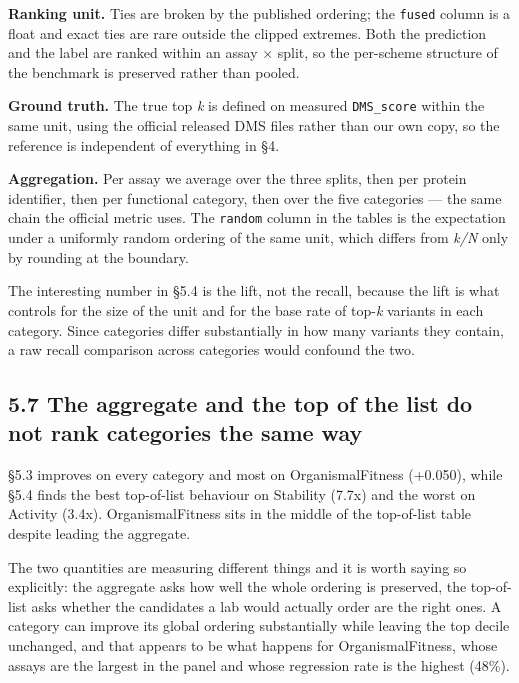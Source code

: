 \textbf{Ranking unit.} Ties are broken by the published ordering; the \texttt{fused} column is a float and exact
ties are rare outside the clipped extremes. Both the prediction and the label are ranked within an
assay × split, so the per-scheme structure of the benchmark is preserved rather than pooled.

\textbf{Ground truth.} The true top \emph{k} is defined on measured \texttt{DMS\_score} within the same unit, using the
official released DMS files rather than our own copy, so the reference is independent of everything in
§4.

\textbf{Aggregation.} Per assay we average over the three splits, then per protein identifier, then per
functional category, then over the five categories --- the same chain the official metric uses. The
\texttt{random} column in the tables is the expectation under a uniformly random ordering of the same unit,
which differs from \emph{k/N} only by rounding at the boundary.

The interesting number in §5.4 is the lift, not the recall, because the lift is what controls for the
size of the unit and for the base rate of top-\emph{k} variants in each category. Since categories differ
substantially in how many variants they contain, a raw recall comparison across categories would
confound the two.

\hypertarget{the-aggregate-and-the-top-of-the-list-do-not-rank-categories-the-same-way}{%
\subsection{5.7 The aggregate and the top of the list do not rank categories the same way}\label{the-aggregate-and-the-top-of-the-list-do-not-rank-categories-the-same-way}}

§5.3 improves on every category and most on OrganismalFitness (+0.050), while §5.4 finds the best
top-of-list behaviour on Stability (7.7x) and the worst on Activity (3.4x). OrganismalFitness sits in
the middle of the top-of-list table despite leading the aggregate.

The two quantities are measuring different things and it is worth saying so explicitly: the aggregate
asks how well the whole ordering is preserved, the top-of-list asks whether the candidates a lab would
actually order are the right ones. A category can improve its global ordering substantially while
leaving the top decile unchanged, and that appears to be what happens for OrganismalFitness, whose
assays are the largest in the panel and whose regression rate is the highest (48\%).

